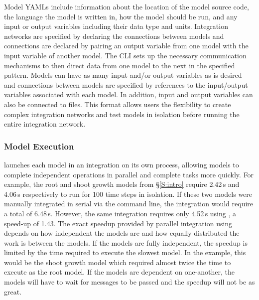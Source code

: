 \documentclass[journal]{IEEEtran}
\newcommand{\todo}[1]{{\color{red}{#1}}}
\newcommand{\pkg}{{\tt \todo{cis\_interface}}{}}
\newcommand{\A}{Appendix{ }}
\newcommand{\rootyml}{}
\newcommand{\shootyml}{}
\newcommand{\intyml}{}
\begin{document}
Model YAMLs include information about the location of the 
model source code, the language the model is written in, how the model should 
be run, and any input or output variables including their data type and units. 
%
%
%
%
Integration networks are specified by declaring the connections 
between models and connections are declared by pairing an output variable from 
one model with the input variable of another model. The {\pkg} 
CLI sets up the necessary communication mechanisms to 
then direct data from one model to the next in the specified pattern. Models 
can have as many input and/or output variables as is desired and connections between models are specified by references to the 
input/output variables associated with each model. In addition, input and output variables can also be connected to files.
%
%
%
This format allows users the 
flexibility to create complex integration networks and test models in isolation before running the entire integration network.


\subsubsection{Model Execution}\label{SS:model_execution}
%
{\pkg} launches each model in an integration on its own process, allowing models to complete independent operations in parallel and complete tasks more quickly. For example, the root and shoot growth models from \S\ref{S:intro} require 2.42\,s and 4.06\,s respectively to run for 100 time steps in isolation. If these two models were manually integrated in serial via the command line, the integration would require a total of 6.48\,s. However, the same integration requires only 4.52\,s using {\pkg}, a speed-up of 1.43. The exact speedup provided by parallel integration using {\pkg} depends on how independent the models are and how equally distributed the work is between the models. If the models are fully independent, the speedup is limited by the time required to execute the slowest model. In the example, this would be the shoot growth model which required almost twice the time to execute as the root model. If the models are dependent on one-another, the models will have to wait for messages to be passed and the speedup will not be as great.
\end{document}
